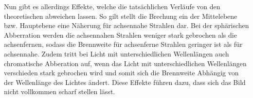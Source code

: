 Nun gibt es allerdings Effekte, welche die tatsächlichen Verläufe von den theoretischen abweichen lassen. So gilt stellt die Brechung ein der Mittelebene bzw. Hauptebene eine Näherung für achsennahe Strahlen dar. Bei der sphärischen Abberration werden die achsennahen Strahlen weniger stark gebrochen als die achsenfernen, sodass die Brennweite für achsenferne Strahlen geringer ist als für achsennahe. Zudem tritt bei Licht mit unterschiedlichen Wellenlängen auch chromatische Abberation auf, wenn das Licht mit unterschiedlichen Wellenlängen verschieden stark gebrochen wird und somit sich die Brennweite Abhängig von der Wellenlänge des Lichtes ändert. Diese Effekte führen dazu, dass sich das Bild nicht vollkommen scharf stellen lässt.
